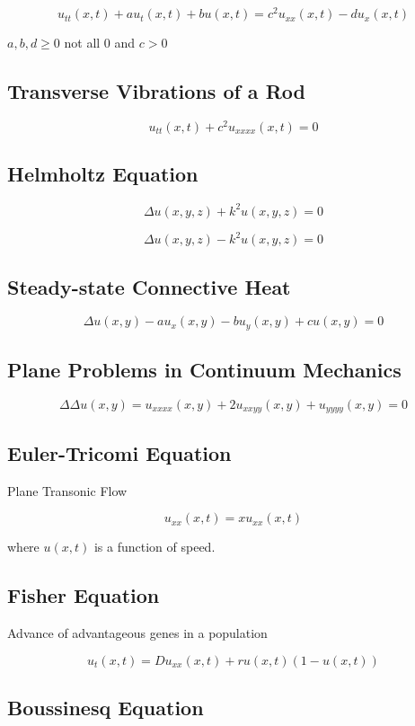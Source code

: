 \documentclass[12pt]{article}
\begin{document}
$$ u_{tt}(x,t) + au_t(x,t) + bu(x,t) = c^2u_{xx}(x,t) - du_x(x,t) $$

$a, b, d \geq 0$ not all 0 and $c > 0 $

\subsection{Transverse Vibrations of a Rod}

$$ u_{tt}(x,t) + c^2u_{xxxx}(x,t) = 0$$

\subsection{Helmholtz Equation}

$$ \Delta u(x,y,z) + k^2u(x,y,z) = 0 $$

$$ \Delta u(x,y,z) - k^2u(x,y,z) = 0 $$

\subsection{Steady-state Connective Heat}

$$ \Delta u(x,y) - au_x(x,y) - bu_y(x,y) + cu(x,y) = 0 $$

\subsection{Plane Problems in Continuum Mechanics}

$$ \Delta\Delta u(x,y) = u_{xxxx}(x,y) + 2u_{xxyy}(x,y) + u_{yyyy}(x,y) = 0$$

\subsection{Euler-Tricomi Equation}

Plane Transonic Flow

$$ u_{xx}(x,t) = xu_{xx}(x,t) $$

where $u(x,t)$ is a function of speed.

\subsection{Fisher Equation}

Advance of advantageous genes in a population

$$ u_t(x,t) = Du_{xx}(x,t) + ru(x,t)(1-u(x,t)) $$

\subsection{Boussinesq Equation}
\end{document}

